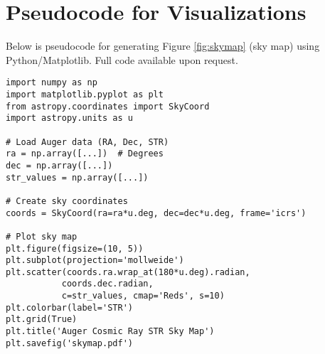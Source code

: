 \documentclass[12pt, twocolumn]{article}
\begin{document}
\appendix
\section{Pseudocode for Visualizations}
\label{app:code}
Below is pseudocode for generating Figure \ref{fig:skymap} (sky map) using Python/Matplotlib. Full code available upon request.

\begin{verbatim}
import numpy as np
import matplotlib.pyplot as plt
from astropy.coordinates import SkyCoord
import astropy.units as u

# Load Auger data (RA, Dec, STR)
ra = np.array([...])  # Degrees
dec = np.array([...])
str_values = np.array([...])

# Create sky coordinates
coords = SkyCoord(ra=ra*u.deg, dec=dec*u.deg, frame='icrs')

# Plot sky map
plt.figure(figsize=(10, 5))
plt.subplot(projection='mollweide')
plt.scatter(coords.ra.wrap_at(180*u.deg).radian, 
           coords.dec.radian, 
           c=str_values, cmap='Reds', s=10)
plt.colorbar(label='STR')
plt.grid(True)
plt.title('Auger Cosmic Ray STR Sky Map')
plt.savefig('skymap.pdf')
\end{verbatim}



\end{document}
